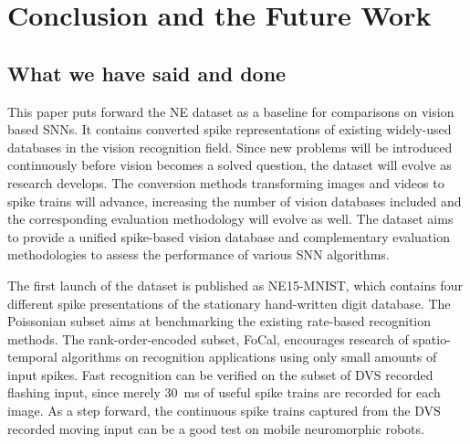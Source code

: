 \section{Conclusion and the Future Work}
\label{sec:summ}
\subsection{What we have said and done}
%
%

This paper puts forward the NE dataset as a baseline for comparisons on vision based SNNs.
It contains converted spike representations of existing widely-used databases in the vision recognition field.
Since new problems will be introduced continuously before vision becomes a solved question, the dataset will evolve as research develops. 
The conversion methods transforming images and videos to spike trains will advance, increasing the number of vision databases included and the corresponding evaluation methodology will evolve as well.
The dataset aims to provide a unified spike-based vision database and complementary evaluation methodologies to assess the performance of various SNN algorithms.

The first launch of the dataset is published as NE15-MNIST, which contains four different spike presentations of the stationary hand-written digit database.
The Poissonian subset aims at benchmarking the existing rate-based recognition methods.
The rank-order-encoded subset, FoCal, encourages research of spatio-temporal algorithms on recognition applications using only small amounts of input spikes.
Fast recognition can be verified on the subset of DVS recorded flashing input, since merely 30~ms of useful spike trains are recorded for each image.
As a step forward, the continuous spike trains captured from the DVS recorded moving input can be a good test on mobile neuromorphic robots.

